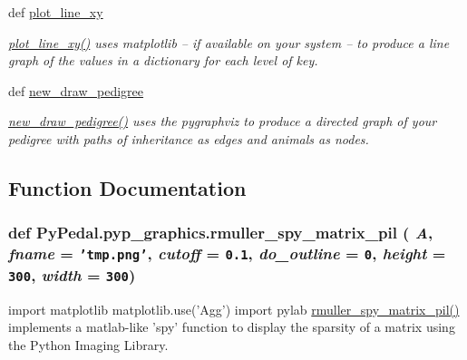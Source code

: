 \begin{CompactItemize}
def \hyperlink{namespacePyPedal_1_1pyp__graphics_903c6e4a4b3fb7f015a9b827c26a3123}{plot\_\-line\_\-xy}
\begin{CompactList}\small\item\em \hyperlink{namespacePyPedal_1_1pyp__graphics_903c6e4a4b3fb7f015a9b827c26a3123}{plot\_\-line\_\-xy()} uses matplotlib -- if available on your system -- to produce a line graph of the values in a dictionary for each level of key. \item\end{CompactList}\item 
def \hyperlink{namespacePyPedal_1_1pyp__graphics_d1890710e78d0f63351d24e84527c570}{new\_\-draw\_\-pedigree}
\begin{CompactList}\small\item\em \hyperlink{namespacePyPedal_1_1pyp__graphics_d1890710e78d0f63351d24e84527c570}{new\_\-draw\_\-pedigree()} uses the pygraphviz to produce a directed graph of your pedigree with paths of inheritance as edges and animals as nodes. \item\end{CompactList}\end{CompactItemize}


\subsection{Function Documentation}
\hypertarget{namespacePyPedal_1_1pyp__graphics_025ff5088109e49fc7936da00a433d60}{
\subsubsection[rmuller\_\-spy\_\-matrix\_\-pil]{\setlength{\rightskip}{0pt plus 5cm}def Py\-Pedal.pyp\_\-graphics.rmuller\_\-spy\_\-matrix\_\-pil ( {\em A},  {\em fname} = {\tt 'tmp.png'},  {\em cutoff} = {\tt 0.1},  {\em do\_\-outline} = {\tt 0},  {\em height} = {\tt 300},  {\em width} = {\tt 300})}}
\label{namespacePyPedal_1_1pyp__graphics_025ff5088109e49fc7936da00a433d60}


import matplotlib matplotlib.use('Agg') import pylab \hyperlink{namespacePyPedal_1_1pyp__graphics_025ff5088109e49fc7936da00a433d60}{rmuller\_\-spy\_\-matrix\_\-pil()} implements a matlab-like 'spy' function to display the sparsity of a matrix using the Python Imaging Library. 

